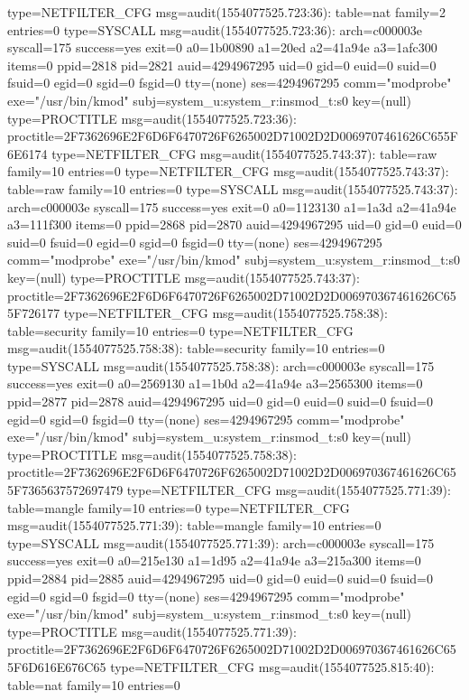 \documentclass[]{report}
\newenvironment{Shaded}{}{}
\newcommand{\NormalTok}[1]{#1}
\begin{document}
\begin{Shaded}
\begin{Highlighting}[]
\NormalTok{type=NETFILTER_CFG msg=audit(1554077525.723:36): table=nat family=2 entries=0}
\NormalTok{type=SYSCALL msg=audit(1554077525.723:36): arch=c000003e syscall=175 success=yes exit=0 a0=1b00890 a1=20ed a2=41a94e a3=1afc300 items=0 ppid=2818 pid=2821 auid=4294967295 uid=0 gid=0 euid=0 suid=0 fsuid=0 egid=0 sgid=0 fsgid=0 tty=(none) ses=4294967295 comm="modprobe" exe="/usr/bin/kmod" subj=system_u:system_r:insmod_t:s0 key=(null)}
\NormalTok{type=PROCTITLE msg=audit(1554077525.723:36): proctitle=2F7362696E2F6D6F6470726F6265002D71002D2D0069707461626C655F6E6174}
\NormalTok{type=NETFILTER_CFG msg=audit(1554077525.743:37): table=raw family=10 entries=0}
\NormalTok{type=NETFILTER_CFG msg=audit(1554077525.743:37): table=raw family=10 entries=0}
\NormalTok{type=SYSCALL msg=audit(1554077525.743:37): arch=c000003e syscall=175 success=yes exit=0 a0=1123130 a1=1a3d a2=41a94e a3=111f300 items=0 ppid=2868 pid=2870 auid=4294967295 uid=0 gid=0 euid=0 suid=0 fsuid=0 egid=0 sgid=0 fsgid=0 tty=(none) ses=4294967295 comm="modprobe" exe="/usr/bin/kmod" subj=system_u:system_r:insmod_t:s0 key=(null)}
\NormalTok{type=PROCTITLE msg=audit(1554077525.743:37): proctitle=2F7362696E2F6D6F6470726F6265002D71002D2D006970367461626C655F726177}
\NormalTok{type=NETFILTER_CFG msg=audit(1554077525.758:38): table=security family=10 entries=0}
\NormalTok{type=NETFILTER_CFG msg=audit(1554077525.758:38): table=security family=10 entries=0}
\NormalTok{type=SYSCALL msg=audit(1554077525.758:38): arch=c000003e syscall=175 success=yes exit=0 a0=2569130 a1=1b0d a2=41a94e a3=2565300 items=0 ppid=2877 pid=2878 auid=4294967295 uid=0 gid=0 euid=0 suid=0 fsuid=0 egid=0 sgid=0 fsgid=0 tty=(none) ses=4294967295 comm="modprobe" exe="/usr/bin/kmod" subj=system_u:system_r:insmod_t:s0 key=(null)}
\NormalTok{type=PROCTITLE msg=audit(1554077525.758:38): proctitle=2F7362696E2F6D6F6470726F6265002D71002D2D006970367461626C655F7365637572697479}
\NormalTok{type=NETFILTER_CFG msg=audit(1554077525.771:39): table=mangle family=10 entries=0}
\NormalTok{type=NETFILTER_CFG msg=audit(1554077525.771:39): table=mangle family=10 entries=0}
\NormalTok{type=SYSCALL msg=audit(1554077525.771:39): arch=c000003e syscall=175 success=yes exit=0 a0=215e130 a1=1d95 a2=41a94e a3=215a300 items=0 ppid=2884 pid=2885 auid=4294967295 uid=0 gid=0 euid=0 suid=0 fsuid=0 egid=0 sgid=0 fsgid=0 tty=(none) ses=4294967295 comm="modprobe" exe="/usr/bin/kmod" subj=system_u:system_r:insmod_t:s0 key=(null)}
\NormalTok{type=PROCTITLE msg=audit(1554077525.771:39): proctitle=2F7362696E2F6D6F6470726F6265002D71002D2D006970367461626C655F6D616E676C65}
\NormalTok{type=NETFILTER_CFG msg=audit(1554077525.815:40): table=nat family=10 entries=0}

\end{Highlighting}
\end{Shaded}
\end{document}
